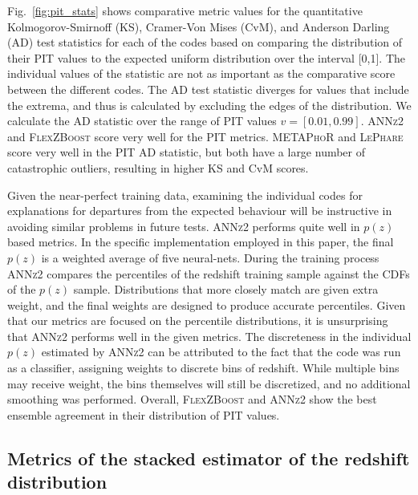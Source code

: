 \documentclass[usenatbib]{mn2e}
\newcommand{\red}[1]{\textcolor{red}{#1}}
\begin{document}
Fig.~\ref{fig:pit_stats} shows comparative metric values for the quantitative Kolmogorov-Smirnoff (KS), Cramer-Von Mises (CvM), and Anderson Darling (AD) test statistics for each of the codes based on comparing the distribution of their PIT values to the expected uniform distribution over the interval [0,1].  The individual values of the statistic are not as important as the comparative score between the different codes.   
The AD test statistic diverges for values that include the extrema, and thus is calculated by excluding the edges of the distribution.  
We calculate the AD statistic over the range of PIT values $v=[0.01,0.99]$.  \textsc{ANNz2} and \textsc{FlexZBoost} score very well for the PIT metrics.  
\textsc{METAPhoR} and \textsc{LePhare} score very well in the PIT AD statistic, but both have a large number of catastrophic outliers, resulting in higher KS and CvM scores.

Given the near-perfect training data, examining the individual codes for explanations for departures from the expected behaviour will be instructive in avoiding similar problems in future tests. 
\textsc{ANNz2} performs quite well in $p(z)$ based metrics.  In the specific implementation employed in this paper, the final $p(z)$ is a weighted average of five neural-nets.  During the training process \textsc{ANNz2} compares the percentiles of the redshift training sample against the CDFs of the $p(z)$ sample.  Distributions that more closely match are given extra weight, and the final weights are designed to produce accurate percentiles.  Given that our metrics are focused on the percentile distributions, it is unsurprising that \textsc{ANNz2} performs well in the given metrics.  The discreteness in the individual $p(z)$ estimated by \textsc{ANNz2} can be attributed to the fact that the code was run as a classifier, assigning weights to discrete bins of redshift.  While multiple bins may receive weight, the bins themselves will still be discretized, and no additional smoothing was performed.
Overall, \textsc{FlexZBoost} and \textsc{ANNz2} show the best ensemble agreement in their distribution of PIT values.

\subsection{Metrics of the stacked estimator of the redshift distribution}\label{sec:stackedmetrics}
\end{document}
